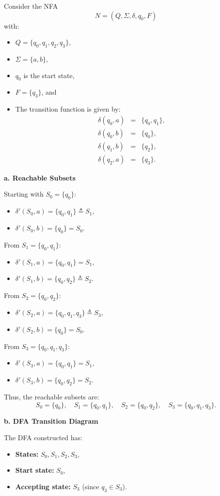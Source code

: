 \documentclass{article}
\theoremstyle{theorem}
\theoremstyle{definition}
\theoremstyle{remark}
\begin{document}
Consider the NFA
\[
N=(Q,\Sigma,\delta,q_0,F)
\]
with:
\begin{itemize}
    \item \(Q=\{q_0,q_1,q_2,q_3\}\),
    \item \(\Sigma=\{a,b\}\),
    \item \(q_0\) is the start state,
    \item \(F=\{q_3\}\), and
    \item The transition function is given by:
      \[
      \begin{array}{rcl}
      \delta(q_0,a) &=& \{q_0,q_1\},\\[1mm]
      \delta(q_0,b) &=& \{q_0\},\\[1mm]
      \delta(q_1,b) &=& \{q_2\},\\[1mm]
      \delta(q_2,a) &=& \{q_3\}.
      \end{array}
      \]
\end{itemize}

\textbf*{a. Reachable Subsets}

Starting with \(S_0=\{q_0\}\):
\begin{itemize}
    \item \(\delta'(S_0,a)=\{q_0,q_1\}\triangleq S_1\),
    \item \(\delta'(S_0,b)=\{q_0\}=S_0\).
\end{itemize}
From \(S_1=\{q_0,q_1\}\):
\begin{itemize}
    \item \(\delta'(S_1,a)=\{q_0,q_1\}=S_1\),
    \item \(\delta'(S_1,b)=\{q_0,q_2\}\triangleq S_2\).
\end{itemize}
From \(S_2=\{q_0,q_2\}\):
\begin{itemize}
    \item \(\delta'(S_2,a)=\{q_0,q_1,q_3\}\triangleq S_3\),
    \item \(\delta'(S_2,b)=\{q_0\}=S_0\).
\end{itemize}
From \(S_3=\{q_0,q_1,q_3\}\):
\begin{itemize}
    \item \(\delta'(S_3,a)=\{q_0,q_1\}=S_1\),
    \item \(\delta'(S_3,b)=\{q_0,q_2\}=S_2\).
\end{itemize}
Thus, the reachable subsets are:
\[
S_0=\{q_0\},\quad S_1=\{q_0,q_1\},\quad S_2=\{q_0,q_2\},\quad S_3=\{q_0,q_1,q_3\}.
\]

\textbf{b. DFA Transition Diagram}

The DFA constructed has:
\begin{itemize}
    \item \textbf{States:} \(S_0, S_1, S_2, S_3\),
    \item \textbf{Start state:} \(S_0\),
    \item \textbf{Accepting state:} \(S_3\) (since \(q_3\in S_3\)).
\end{itemize}
\end{document}
